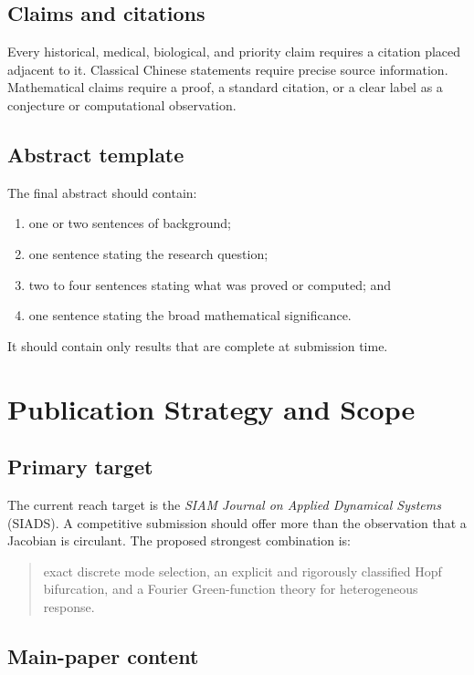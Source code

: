 \documentclass[11pt, reqno]{amsart}
\theoremstyle{definition}
\theoremstyle{remark}
\begin{document}
\subsection{Claims and citations}

Every historical, medical, biological, and priority claim requires a citation
placed adjacent to it.  Classical Chinese statements require precise source
information.  Mathematical claims require a proof, a standard citation, or a
clear label as a conjecture or computational observation.

\subsection{Abstract template}

The final abstract should contain:
\begin{enumerate}[label=(\arabic*),leftmargin=2.5em]
    \item one or two sentences of background;
    \item one sentence stating the research question;
    \item two to four sentences stating what was proved or computed; and
    \item one sentence stating the broad mathematical significance.
\end{enumerate}
It should contain only results that are complete at submission time.

\section{Publication Strategy and Scope}
\label{app:publication}

\subsection{Primary target}

The current reach target is the \emph{SIAM Journal on Applied Dynamical Systems}
(SIADS).  A competitive submission should offer more than the observation that
a Jacobian is circulant.  The proposed strongest combination is:
\begin{quote}
exact discrete mode selection, an explicit and rigorously classified Hopf
bifurcation, and a Fourier Green-function theory for heterogeneous response.
\end{quote}

\subsection{Main-paper content}
\end{document}
